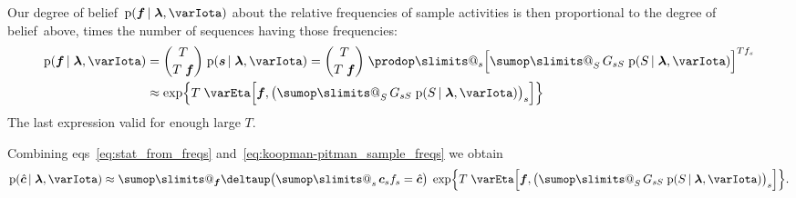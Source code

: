 \documentclass[\ifafour a4paper,12pt,\else a5paper,10pt,\fi%
onecolumn,oneside,article,%
british%
]{memoir}
\makeatletter
\theoremstyle{remark}
\theoremstyle{innote}
\def\sum{\DOTSI\sumop\slimits@}
\def\prod{\DOTSI\prodop\slimits@}
\newcommand*{\delt}{\deltaup}%
\newcommand*{\di}{\mathrm{d}}%
\newcommand*{\RR}{\bm{\mathrm{R}}}
\newcommand*{\defd}{\coloneqq}
\newcommand*{\pf}{\mathrm{p}}%
\renewcommand*{\|}{\nonscript\,\vert\nonscript\;\mathopen{}}
\newcommand*{\eqns}{eqs}%
\newcommand*{\tsum}{\mathop{\textstyle\sum}\nolimits}
\newcommand*{\dob}{degree of belief}
\newcommand*{\yS}{S}
\newcommand*{\ySt}{\bm{\yS}}
\newcommand*{\ys}{s}
\newcommand*{\yst}{\bm{\ys}}
\newcommand*{\yll}{\lambda}
\newcommand*{\yl}{\bm{\lambda}}
\newcommand*{\yg}{g}
\newcommand*{\yI}{\varIota}
\newcommand*{\yf}{\bm{f}}
\newcommand*{\yH}{\varEta}
\newcommand*{\ycs}{\bm{c}}
\newcommand*{\yccs}{\Hat{\bm{c}}}
\makeatother
\begin{document}
Our \dob\ $\pf(\yf \| \yl, \yI)$ about the relative frequencies of sample
activities is then proportional to the \dob\ above, times the number of
sequences having those frequencies:
\begin{equation}
  \label{eq:koopman-pitman_sample_freqs}
  \begin{split}
    \pf(\yf \| \yl, \yI) &= \binom{T}{T\;\yf}\; \pf(\yst \| \yl, \yI)
    = \binom{T}{T\;\yf}\; \prod_{\ys}\Bigl[
    \tsum_{\yS} G_{\ys\yS}\;\pf(\yS \| \yl, \yI)
    \Bigr]^{T f_{\ys}}
    \\
    &\approx
    \exp\Bigl\{
    T\;\yH\Bigl[\yf,
    \bigl(\tsum_{\yS} G_{\ys\yS}\;\pf(\yS \| \yl, \yI)\bigr)_{\ys}\Bigr]
    \Bigr\}
  \end{split}
\end{equation}
The last expression valid for enough large $T$.

Combining \eqns~\eqref{eq:stat_from_freqs}
and~\eqref{eq:koopman-pitman_sample_freqs} we obtain
\begin{equation}
  \label{eq:posterior_given_statistics}
    \pf(\yccs \| \yl, \yI) \approx
    \sum_{\yf} \delt\bigl(\tsum_{\ys} \ycs_{\ys} f_{\ys} = \yccs\bigr)\;
    \exp\Bigl\{
    T\;\yH\Bigl[\yf,
    \bigl(\tsum_{\yS} G_{\ys\yS}\;\pf(\yS \| \yl, \yI)\bigr)_{\ys}\Bigr]
    \Bigr\}.    
\end{equation}
\end{document}
